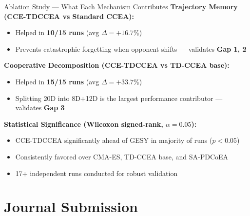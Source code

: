 \documentclass[aspectratio=169, 10pt]{beamer}
\begin{document}
\begin{frame}{Ablation Study --- What Each Mechanism Contributes}
\small
\textbf{Trajectory Memory (CCE-TDCCEA vs Standard CCEA):}
\begin{itemize}
    \item Helped in \textbf{10/15 runs} (avg $\Delta = +16.7\%$)
    \item Prevents catastrophic forgetting when opponent shifts --- validates \textbf{Gap 1, 2}
\end{itemize}
\vspace{0.2cm}
\textbf{Cooperative Decomposition (CCE-TDCCEA vs TD-CCEA base):}
\begin{itemize}
    \item Helped in \textbf{15/15 runs} (avg $\Delta = +33.7\%$)
    \item Splitting 20D into 8D+12D is the largest performance contributor --- validates \textbf{Gap 3}
\end{itemize}
\vspace{0.2cm}
\textbf{Statistical Significance (Wilcoxon signed-rank, $\alpha=0.05$):}
\begin{itemize}
    \item CCE-TDCCEA significantly ahead of GESY in majority of runs ($p<0.05$)
    \item Consistently favored over CMA-ES, TD-CCEA base, and SA-PDCoEA
    \item 17+ independent runs conducted for robust validation
\end{itemize}
\end{frame}

\section{Journal Submission}
\end{document}
